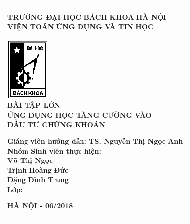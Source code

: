 \documentclass[14pt]{extreport}
\begin{document}
\newcommand{\Khung}[2]{
\begin{tabular}{|l|}
\hline\rule[-2ex]{0pt}{5.5ex}
\parbox{#1}{#2}\\
\hline
\end{tabular}
}

\Khung{.92\textwidth}{

\begin{center}
\normalsize
\textbf{TRƯỜNG ĐẠI HỌC BÁCH KHOA HÀ NỘI}\\
\normalsize
\textbf{VIỆN TOÁN ỨNG DỤNG VÀ TIN HỌC}\\
\textbf{------------------------------------------------------}\\[0.4cm]
\includegraphics[scale=.8]{logobkdentrang}\\[1.2cm]
\textbf{{ BÀI TẬP LỚN}}\\
\textbf{{\large ỨNG DỤNG HỌC TĂNG CƯỜNG VÀO}}\\
\textbf{{\large ĐẦU TƯ CHỨNG KHOÁN}}\\
\end{center}
\begin{flushleft}
\vspace{1.3cm}
\hspace{1.5cm} \textbf{ Giáng viên hướng dẫn:{ TS. Nguyễn Thị Ngọc Anh }}\\[0.2cm]
\hspace{1.5cm} \textbf{ Nhóm Sinh viên thực hiện:}\\[0.2cm]
\hspace{7.4cm}\textbf{ Vũ Thị Ngọc}\\[0.2cm]
\hspace{7.4cm}\textbf{ Trịnh Hoàng Đức}\\[0.2cm]
\hspace{7.4cm}\textbf{ Đặng Đình Trung}\\[0.2cm]
\hspace{1.5cm} \textbf{ Lớp:\hspace{4.5cm}{ KSTN Toán Tin K60}}\\
\end{flushleft}

\begin{center}
\textbf{{\small HÀ NỘI - 06/2018}}\\
\end{center}
 }
\thispagestyle{empty}
\newpage
\end{document}
